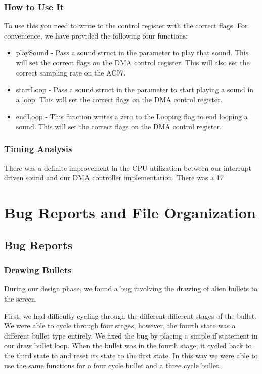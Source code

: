 \documentclass[11pt,letter,oneside]{report}
\begin{document}
\subsection{How to Use It}
	To use this you need to write to the control register with the correct flags. For convenience, we have provided the following four functions:

\begin{itemize}
\item playSound - Pass a sound struct in the parameter to play that sound. This will set the correct flags on the DMA control register. This will also set the correct sampling rate on the AC97.
\item startLoop - Pass a sound struct in the parameter to start playing a sound in a loop. This will set the correct flags on the DMA control register.
\item endLoop - This function writes a zero to the Looping flag to end looping a sound. This will set the correct flags on the DMA control register. 
\end{itemize}

\subsection{Timing Analysis}
	There was a definite improvement in the CPU utilization between our interrupt driven sound and our DMA controller implementation. There was a 17%

\chapter{Bug Reports and File Organization}

\section{Bug Reports}

\subsection{Drawing Bullets}
During our design phase, we found a bug involving the drawing of alien bullets to the screen. 

First, we had difficulty cycling through the different different stages of the bullet. We were able to cycle through four stages, however, the fourth state was a different bullet type entirely. We fixed the bug by placing a simple if statement in our draw bullet loop. When the bullet was in the fourth stage, it cycled back to the third state to and reset its state to the first state. In this way we were able to use the same functions for a four cycle bullet and a three cycle bullet.
\end{document}
